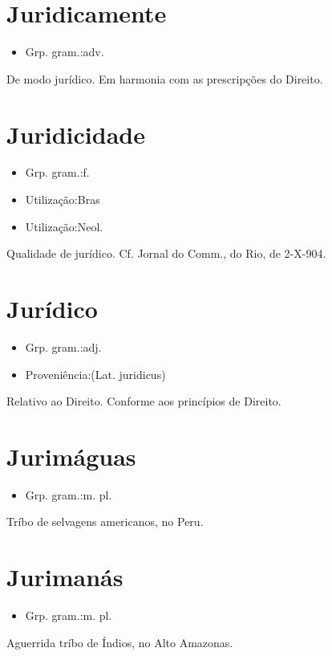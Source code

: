 \documentclass{article}
\begin{document}
\section{Juridicamente}
\begin{itemize}
\item {Grp. gram.:adv.}
\end{itemize}
De modo jurídico.
Em harmonia com as prescripções do Direito.
\section{Juridicidade}
\begin{itemize}
\item {Grp. gram.:f.}
\end{itemize}
\begin{itemize}
\item {Utilização:Bras}
\end{itemize}
\begin{itemize}
\item {Utilização:Neol.}
\end{itemize}
Qualidade de jurídico. Cf. \textunderscore Jornal do Comm.\textunderscore , do Rio, de 2-X-904.
\section{Jurídico}
\begin{itemize}
\item {Grp. gram.:adj.}
\end{itemize}
\begin{itemize}
\item {Proveniência:(Lat. \textunderscore juridicus\textunderscore )}
\end{itemize}
Relativo ao Direito.
Conforme aos princípios de Direito.
\section{Jurimáguas}
\begin{itemize}
\item {Grp. gram.:m. pl.}
\end{itemize}
Tríbo de selvagens americanos, no Peru.
\section{Jurimanás}
\begin{itemize}
\item {Grp. gram.:m. pl.}
\end{itemize}
Aguerrida tríbo de Índios, no Alto Amazonas.
\end{document}
